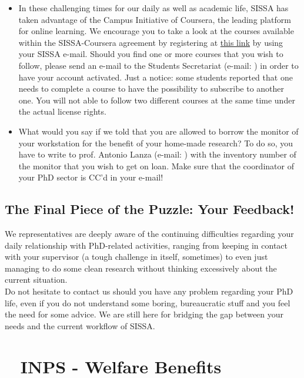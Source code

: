 \documentclass{sissavademecum}
\begin{document}
\begin{itemize}
	\item In these challenging times for our daily as well as academic life, SISSA has taken advantage of the Campus Initiative of Coursera, the leading platform for online learning. We encourage you to take a look at the courses available within the SISSA-Coursera agreement by registering at \href{https://www.coursera.org/programs/sissa-on-coursera-dkw8c}{this link} by using your SISSA e-mail. Should you find one or more courses that you wish to follow, please send an e-mail to the Students Secretariat (e-mail: ) in order to have your account activated. Just a notice: some students reported that one needs to complete a course to have the possibility to subscribe to another one. You will not able to follow two different courses at the same time under the actual license rights.
	
	\item What would you say if we told that you are allowed to borrow the monitor of your workstation for the benefit of your home-made research? To do so, you have to write to prof. Antonio Lanza (e-mail: ) with the inventory number of the monitor that you wish to get on loan. Make sure that the coordinator of your PhD sector is CC'd in your e-mail!
\end{itemize}


\section{The Final Piece of the Puzzle: Your Feedback!}

We representatives are deeply aware of the continuing difficulties regarding your daily relationship with PhD-related activities, ranging from keeping in contact with your supervisor (a tough challenge in itself, sometimes) to even just managing to do some clean research without thinking excessively about the current situation. \\
Do not hesitate to contact us should you have any problem regarding your PhD life, even if you do not understand some boring, bureaucratic stuff and you feel the need for some advice. We are still here for bridging the gap between your needs and the current workflow of SISSA.




\chapter{\texorpdfstring{\faFileInvoiceDollar\ }{} INPS - Welfare Benefits}
\label{sec:gestione_separata_inps}
\end{document}
